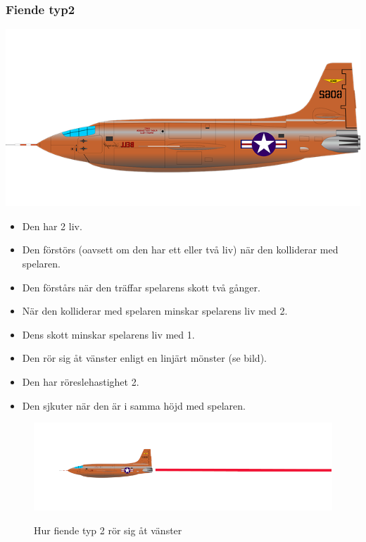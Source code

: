 \documentclass{TDP005mall}
\begin{document}
\subsubsection*{Fiende typ2}
\includegraphics[scale=0.2]{Images/Enemy2.png}
\begin{itemize}
\item Den har 2 liv.
\item Den förstörs (oavsett om den har ett eller två liv) när den kolliderar med spelaren.
\item Den förstårs när den träffar spelarens skott två gånger.
\item När den kolliderar med spelaren minskar spelarens liv med 2.
\item Dens skott minskar spelarens liv med 1.
\item Den rör sig åt vänster enligt en linjärt mönster (se bild).
\item Den har röreslehastighet 2.
\item Den sjkuter när den är i samma höjd med spelaren.
\end{itemize}
\begin{figure}[h!]
  \centering
  \includegraphics[scale=0.4]{Images/Enemy2-movement.png}
  \label{Bild 2}
  \caption{Hur fiende typ 2 rör sig åt vänster}
\end{figure}

\newpage
\end{document}

